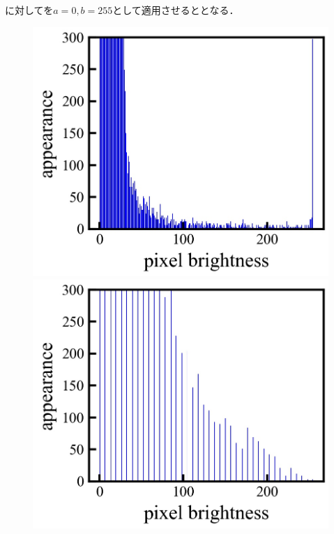 に対してを$a=0,b=255$として適用させるととなる．
\begin{figure}[h]
	\begin{center}
		\begin{minipage}{0.3\linewidth}
			\includegraphics[width=0.98\columnwidth]{./theory/figure/5/norm_hist_0.jpg}
		\end{minipage}
		\begin{minipage}{0.3\linewidth}
			\includegraphics[width=0.98\columnwidth]{./theory/figure/5/norm_hist_1.jpg}
		\end{minipage}

\end{center}
\end{figure}
